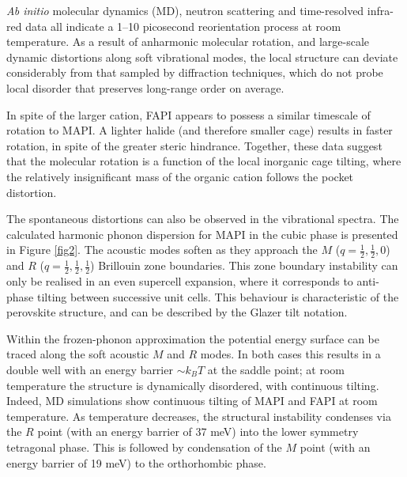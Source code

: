 \emph{Ab initio} molecular dynamics (MD), neutron scattering\autocite{Leguy2015b,Chen2015s} and time-resolved infra-red\autocite{Bakulin2015a} data all indicate a 1--10 picosecond reorientation process at room temperature.
As a result of anharmonic molecular rotation, and large-scale dynamic distortions along soft 
vibrational modes, the local structure can deviate considerably from that sampled by diffraction techniques, which do not probe local disorder that preserves long-range order on average.

In spite of the larger cation, FAPI appears to possess a similar timescale of rotation to MAPI\autocite{Weller2015b}. 
A lighter halide (and therefore smaller cage) results in faster rotation, in spite of the greater steric hindrance.\autocite{selig2017organic}
Together, these data suggest that the molecular rotation is a function of the local inorganic cage tilting, where the relatively insignificant mass of the organic cation follows the pocket distortion. 

The spontaneous distortions can also be observed in the vibrational spectra.
The calculated harmonic phonon dispersion for MAPI in the cubic phase is presented in Figure \ref{fig2}.
The acoustic modes soften as they approach the $M$ ($q = \frac{1}{2}, \frac{1}{2}, 0$) and $R$ ($q = \frac{1}{2}, \frac{1}{2}, \frac{1}{2}$) Brillouin zone boundaries. 
This zone boundary instability can only be realised in an even supercell expansion, where it corresponds to anti-phase tilting between successive unit cells.
This behaviour is characteristic of the perovskite structure, and can be described by the Glazer tilt notation.\autocite{Glazer1972,Woodward1997} 

Within the frozen-phonon approximation the potential energy surface can be traced along the soft acoustic $M$ and $R$ modes. 
In both cases this results in a double well with an energy barrier $\sim k_BT$ at the saddle point;\autocite{Whalley2016}   
at room temperature the structure is dynamically disordered, with continuous tilting.
Indeed, MD simulations show continuous tilting of MAPI and FAPI at room temperature.\autocite{Frost2014,Quarti2015a,Weller2015b}
%
As temperature decreases, the structural instability condenses via the $R$ point (with an energy barrier of 37 meV) into the lower symmetry tetragonal phase. 
This is followed by condensation of the $M$ point (with an energy barrier of 19 meV) to the orthorhombic phase.\autocite{Whalley2016}

